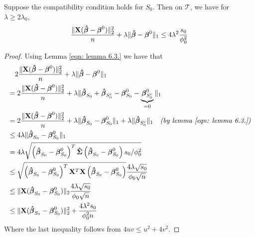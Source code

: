 \begin{theorem}[Theorem 6.1.]
    Suppose the compatibility condition holds for $S_{0}$. Then on $\mathscr{T}$, we have for $\lambda \geq 2 \lambda_{0}$,
    $$
        \frac{\|\mathbf{X}(\boldsymbol{\hat{\beta}}-\boldsymbol{\beta}^{0})\|_{2}^{2}}{n}+\lambda\|\boldsymbol{\hat{\beta}}-\boldsymbol{\beta}^{0}\|_{1} \leq 4 \lambda^{2} \frac{s_{0}}{\phi_{0}^{2}}
    $$
\end{theorem}
\begin{proof}
    Using Lemma \ref{eqn: lemma 6.3.} we have that
    \begin{align*}
         & \quad 2 \frac{\|\mathbf{X}(\boldsymbol{\hat{\beta}}-\boldsymbol{\beta}^{0})\|_{2}^{2}}{n} + \lambda\|\boldsymbol{\hat{\beta}}-\boldsymbol{\beta}^{0}\|_{1}                                                                                                    \\
         & = 2 \frac{\|\mathbf{X}(\boldsymbol{\hat{\beta}}-\boldsymbol{\beta}^{0})\|_{2}^{2}}{n} + \lambda \| \boldsymbol{\hat{\beta}}_{S_0} + \boldsymbol{\hat{\beta}}_{S_{0}^{c}} - \boldsymbol{\beta}^{0}_{S_0} - \underbrace{\boldsymbol{\beta}^{0}_{S_0^c}}_{=0} \|_{1}                            \\
         & = 2 \frac{\|\mathbf{X}(\boldsymbol{\hat{\beta}}-\boldsymbol{\beta}^{0})\|_{2}^{2}}{n} + \lambda \| \boldsymbol{\hat{\beta}}_{S_0} - \boldsymbol{\beta}^{0}_{S_0} \|_{1} + \lambda \| \boldsymbol{\hat{\beta}}_{S_{0}^{c}} \|_1 \quad \textit{(by lemma \ref{eqn: lemma 6.3.})} \\
         & \leq 4 \lambda \|\boldsymbol{\hat{\beta}}_{S_{0}} - \boldsymbol{\beta}_{S_{0}}^{0} \|_{1}                                                                                                                                      \\
         & = 4 \lambda \sqrt{\left( \boldsymbol{\hat{\beta}}_{S_{0}} - \boldsymbol{\beta}_{S_{0}}^{0} \right)^{T} \boldsymbol{\hat{\Sigma}} \left( \boldsymbol{\hat{\beta}}_{S_{0}} - \boldsymbol{\beta}_{S_{0}}^{0}  \right) s_{0} / \phi_{0}^{2}}                                        \\
         & \leq \sqrt{\left( \boldsymbol{\hat{\beta}}_{S_{0}} - \boldsymbol{\beta}_{S_{0}}^{0} \right)^{T} \mathbf{X}^T \mathbf{X} \left( \boldsymbol{\hat{\beta}}_{S_{0}} - \boldsymbol{\beta}_{S_{0}}^{0}  \right)} \frac{4 \lambda \sqrt{s_{0}}}{\phi_{0} \sqrt{n}}                   \\
         & \leq \| \mathbf{X} ( \boldsymbol{\hat{\beta}}_{S_{0}} - \boldsymbol{\beta}_{S_{0}}^{0} ) \|_2 \frac{4 \lambda \sqrt{s_{0}}}{\phi_{0} \sqrt{n}}                                                                                         \\
         & \leq \| \mathbf{X} ( \boldsymbol{\hat{\beta}}_{S_{0}} - \boldsymbol{\beta}_{S_{0}}^{0} ) \|^2_2 + \frac{4 \lambda^2 s_{0}}{\phi^2_{0} n}                                                                                               \\
    \end{align*}
    Where the last inequality follows from $4uv \leq u^2 + 4v^2$.
\end{proof}


